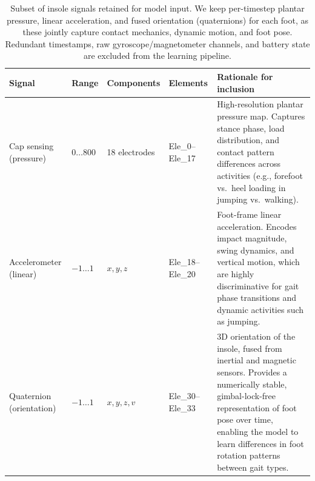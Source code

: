 \begin{table}[t]
    \centering
    \small
    \begin{tabularx}{\textwidth}{|l|l|l|l|X|}
      \hline
      \textbf{Signal} & \textbf{Range} & \textbf{Components} & \textbf{Elements} & \textbf{Rationale for inclusion} \\
      \hline
      Cap sensing (pressure) & \(0 \dots 800\) & 18 electrodes & Ele\_0--Ele\_17 & High-resolution plantar pressure map. Captures stance phase, load distribution, and contact pattern differences across activities (e.g., forefoot vs.\ heel loading in jumping vs.\ walking). \\
      \hline
      Accelerometer (linear) & \(-1 \dots 1\) & \(x, y, z\) & Ele\_18--Ele\_20 & Foot-frame linear acceleration. Encodes impact magnitude, swing dynamics, and vertical motion, which are highly discriminative for gait phase transitions and dynamic activities such as jumping. \\
      \hline
      Quaternion (orientation) & \(-1 \dots 1\) & \(x, y, z, v\) & Ele\_30--Ele\_33 & 3D orientation of the insole, fused from inertial and magnetic sensors. Provides a numerically stable, gimbal-lock-free representation of foot pose over time, enabling the model to learn differences in foot rotation patterns between gait types. \\
      \hline
    \end{tabularx}
    \caption{Subset of insole signals retained for model input. We keep per-timestep plantar pressure, linear acceleration, and fused orientation (quaternions) for each foot, as these jointly capture contact mechanics, dynamic motion, and foot pose. Redundant timestamps, raw gyroscope/magnetometer channels, and battery state are excluded from the learning pipeline.}
    \label{tab:insole-features-selected}
  \end{table}

